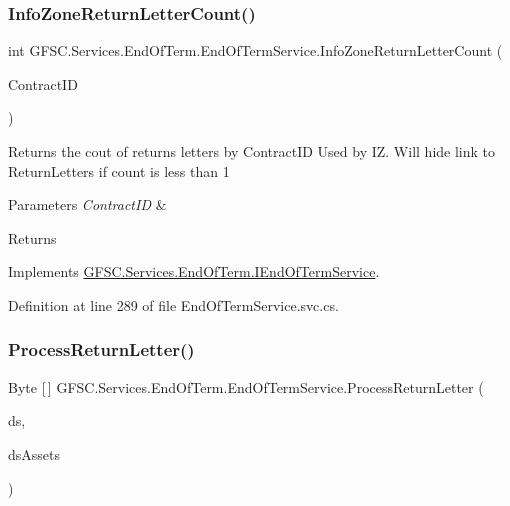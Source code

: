 \subsubsection{\texorpdfstring{Info\+Zone\+Return\+Letter\+Count()}{InfoZoneReturnLetterCount()}}
{\footnotesize\ttfamily int G\+F\+S\+C.\+Services.\+End\+Of\+Term.\+End\+Of\+Term\+Service.\+Info\+Zone\+Return\+Letter\+Count (\begin{DoxyParamCaption}\item[{string}]{Contract\+ID }\end{DoxyParamCaption})}



Returns the cout of returns letters by Contract\+ID Used by IZ. Will hide link to Return\+Letters if count is less than 1 


\begin{DoxyParams}{Parameters}
{\em Contract\+ID} & \\
\hline
\end{DoxyParams}
\begin{DoxyReturn}{Returns}

\end{DoxyReturn}


Implements \mbox{\hyperlink{interface_g_f_s_c_1_1_services_1_1_end_of_term_1_1_i_end_of_term_service_a5e44a51ef8aa9c8c01ef89ec860ffedc}{G\+F\+S\+C.\+Services.\+End\+Of\+Term.\+I\+End\+Of\+Term\+Service}}.



Definition at line 289 of file End\+Of\+Term\+Service.\+svc.\+cs.

\mbox{\label{class_g_f_s_c_1_1_services_1_1_end_of_term_1_1_end_of_term_service_a333d59240ab862fff560fe3af9a9e1ed}} 
\subsubsection{\texorpdfstring{Process\+Return\+Letter()}{ProcessReturnLetter()}}
{\footnotesize\ttfamily Byte \mbox{[}$\,$\mbox{]} G\+F\+S\+C.\+Services.\+End\+Of\+Term.\+End\+Of\+Term\+Service.\+Process\+Return\+Letter (\begin{DoxyParamCaption}\item[{Data\+Set}]{ds,  }\item[{Data\+Set}]{ds\+Assets }\end{DoxyParamCaption})}



